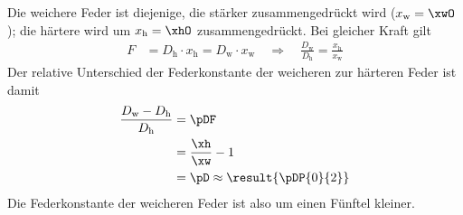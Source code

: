 Die weichere Feder ist diejenige, die stärker zusammengedrückt wird ($x_\text{w} = \xwO$); die härtere wird um $x_\text{h} = \xhO$ zusammengedrückt. Bei gleicher Kraft gilt
\begin{align}
 F &= D_\text{h}\cdot x_\text{h} = D_\text{w}\cdot x_\text{w}
 \quad\Rightarrow\quad \frac{D_\text{w}}{D_\text{h}} = \frac{x_\text{h}}{x_\text{w}}
\end{align}
Der relative Unterschied der Federkonstante der weicheren zur härteren Feder ist damit
\begin{align}
 \frac{D_\text{w}-D_\text{h}}{D_\text{h}} &= \pDF \\
   &= \frac{\xh}{\xw}-1 \\
   &= \pD \approx \result{\pDP{0}{2}}
\end{align}
Die Federkonstante der weicheren Feder ist also um einen Fünftel kleiner.

